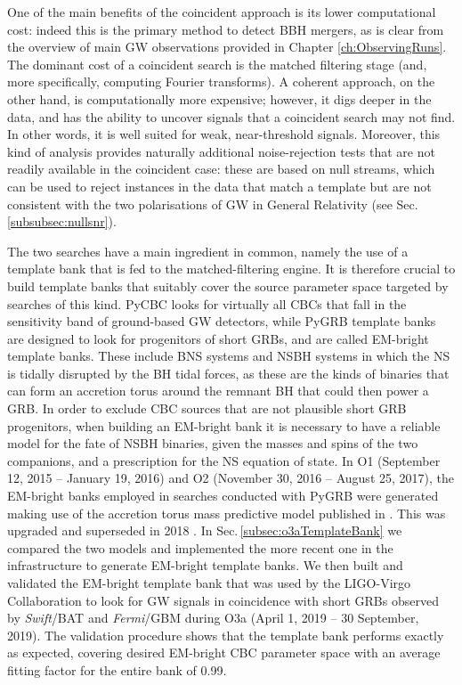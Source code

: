 \documentclass[binding=0.6cm, LaM]{sapthesis}
\begin{document}
        One of the main benefits of the coincident approach is its lower computational cost: 
	indeed this is the primary method to detect BBH mergers, as is clear from the overview of main GW observations 
	provided in Chapter \ref{ch:ObservingRuns}.
        The dominant cost of a coincident search is the matched filtering stage 
	(and, more specifically, computing Fourier transforms).
        A coherent approach, on the other hand, is computationally more expensive;
        however, it digs deeper in the data, and has the ability to uncover signals that 
	a coincident search may not find.  
	In other words, it is well suited for weak, near-threshold signals.
        Moreover, this kind of analysis provides naturally additional noise-rejection tests
        that are not readily available in the coincident case: 
	these are based on null streams, which can be used to reject instances 
	in the data that match a template but are
        not consistent with the two polarisations of GW in General Relativity (see Sec.\,\ref{subsubsec:nullsnr}).

	The two searches have a main ingredient in common, namely the use of a template bank
	that is fed to the matched-filtering engine.
	It is therefore crucial to build template banks that suitably cover 
	the source parameter space targeted by searches of this kind.
	{\ttfamily PyCBC} looks for virtually all CBCs that fall in the sensitivity band 
	of ground-based GW detectors, while {\ttfamily PyGRB}
        template banks are designed to look for progenitors of short GRBs,
        and are called EM-bright template banks.
        These include BNS systems and NSBH systems in which the NS is tidally disrupted by the BH tidal forces, 
	as these are the kinds of binaries
	that can form an accretion torus around the remnant BH that could then power a GRB.
        In order to exclude CBC sources that are not plausible short GRB progenitors, 
	when building an EM-bright bank it is necessary to have a reliable model
        for the fate of NSBH binaries, given the masses and spins of the two companions, 
	and a prescription for the NS equation of state.
        In O1 (September 12, 2015 -- January 19, 2016) and O2 (November 30, 2016 -- August 25, 2017), 
	the EM-bright banks employed in searches conducted with {\ttfamily PyGRB} 
	were generated making use of the accretion torus mass predictive model published in \cite{50}.
        This was upgraded and superseded in 2018 \cite{54}.
 	In Sec.\,\ref{subsec:o3aTemplateBank} we compared the two models 
        and implemented the more recent one in the infrastructure to generate EM-bright template banks.
        We then built and validated the EM-bright template bank that was used by 
	the LIGO-Virgo Collaboration to look for GW signals in coincidence with 
        short GRBs observed by {\it Swift}/BAT and {\it Fermi}/GBM during O3a (April 1, 2019 -- 30 September, 2019). 
        The validation procedure shows that the template bank performs exactly as expected,
        covering desired EM-bright CBC parameter space
        with an average fitting factor for the entire bank of 0.99.
\end{document}
